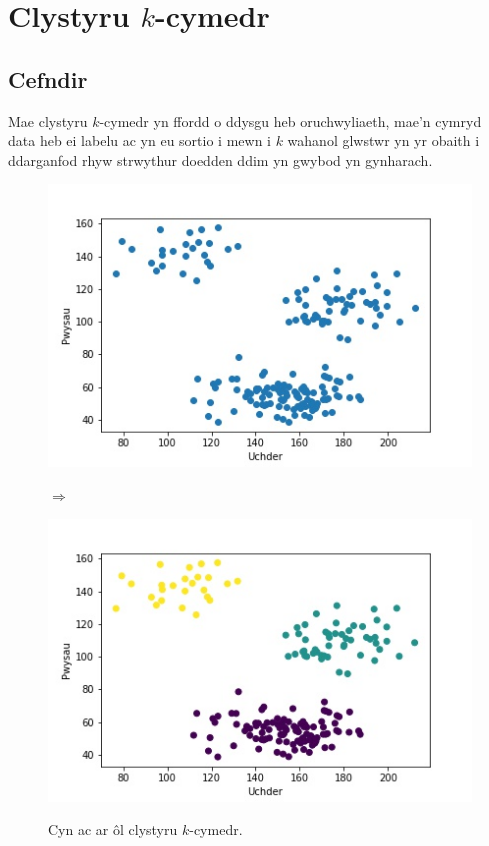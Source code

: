 \chapter{Clystyru $k$-cymedr}\label{cha:literature}
\section{Cefndir}
Mae clystyru $k$-cymedr yn ffordd o ddysgu heb oruchwyliaeth, mae'n cymryd data heb ei labelu ac yn eu sortio i mewn i $k$ wahanol glwstwr yn yr obaith i ddarganfod rhyw strwythur doedden ddim yn gwybod yn gynharach.

\begin{figure}
\begin{center}
\begin{minipage}{.4\linewidth}
\includegraphics[width=1\linewidth]{../img/Scatterpython.jpeg}
\end{minipage}%
\begin{minipage}{1cm}
$\Rightarrow$
\end{minipage}%
\begin{minipage}{.4\linewidth}
\includegraphics[width=1\linewidth]{../img/3clystwrpython.jpeg}
\end{minipage}%
\label{fig:Cefndir_Clysteru_k_modd}
\caption{Cyn ac ar \^{o}l clystyru $k$-cymedr.}
\end{center}
\end{figure}

